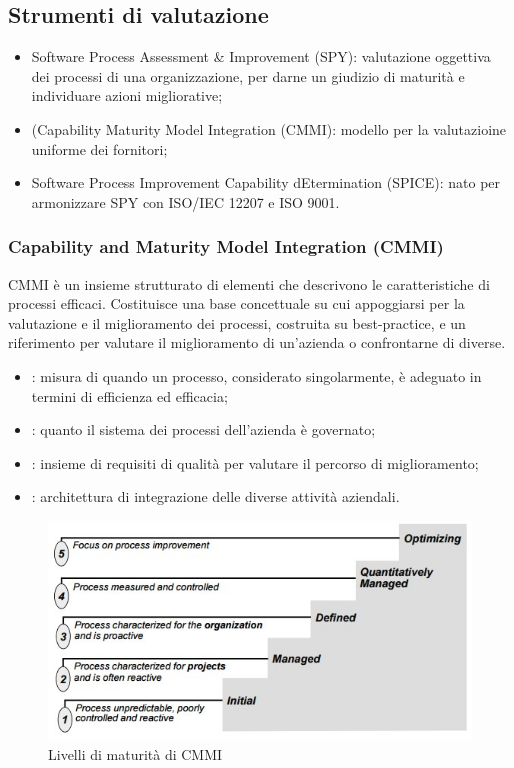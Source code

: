 \subsection{Strumenti di valutazione}
\label{sub:strumenti_di_valutazione}

\begin{itemize}
  \item Software Process Assessment \& Improvement (SPY): valutazione oggettiva
    dei processi di una organizzazione, per darne un giudizio di maturità e
    individuare azioni migliorative;
  \item (Capability Maturity Model Integration (CMMI): modello per la
    valutazioine uniforme dei fornitori;
  \item Software Process Improvement Capability dEtermination (SPICE): nato per
    armonizzare SPY con ISO/IEC 12207 e ISO 9001.
\end{itemize}

\subsubsection{Capability and Maturity Model Integration (CMMI)}
\label{ssub:capability_and_maturity_model_integration}

CMMI è un insieme strutturato di elementi che descrivono le caratteristiche di
processi efficaci. Costituisce una base concettuale su cui appoggiarsi per la
valutazione e il miglioramento dei processi, costruita su best-practice, e un
riferimento per valutare il miglioramento di un'azienda o confrontarne di
diverse.

\begin{itemize}
  \item {}: misura di quando un processo, considerato
    singolarmente, è adeguato in termini di efficienza ed efficacia;
  \item {}: quanto il sistema dei processi dell'azienda è
    governato;
  \item {}: insieme di requisiti di qualità per valutare il percorso
    di miglioramento;
  \item {}: architettura di integrazione delle diverse
    attività aziendali.
\end{itemize}

\begin{figure}[h!]
  \centering
  \includegraphics[scale=0.5]{imgs/cmmi_maturity_level}
  \caption{Livelli di maturità di CMMI}
\end{figure}
